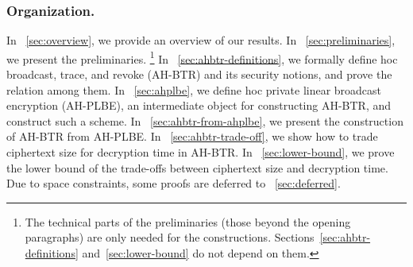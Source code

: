 \subsubsection{Organization.}
In \Section~\ref{sec:overview}, we provide an overview of our results.
In \Section~\ref{sec:preliminaries}, we present the preliminaries.%
\footnote{The technical parts of the preliminaries (those beyond the opening paragraphs) are only needed for the constructions.
Sections~\ref{sec:ahbtr-definitions} and~\ref{sec:lower-bound} do not depend on them.}
In \Section~\ref{sec:ahbtr-definitions}, we formally define \ad hoc broadcast, trace, and revoke (AH-BTR) and its security notions, and prove the relation among them.
In \Section~\ref{sec:ahplbe}, we define \ad hoc private linear broadcast encryption (AH-PLBE), an intermediate object for constructing AH-BTR, and construct such a scheme.
In \Section~\ref{sec:ahbtr-from-ahplbe}, we present the construction of AH-BTR from AH-PLBE.
In \Section~\ref{sec:ahbtr-trade-off}, we show how to trade ciphertext size for decryption time in AH-BTR.
In \Section~\ref{sec:lower-bound}, we prove the lower bound of the trade-offs between ciphertext size and decryption time.
Due to space constraints,
some proofs are deferred to \Section~\ref{sec:deferred}.
